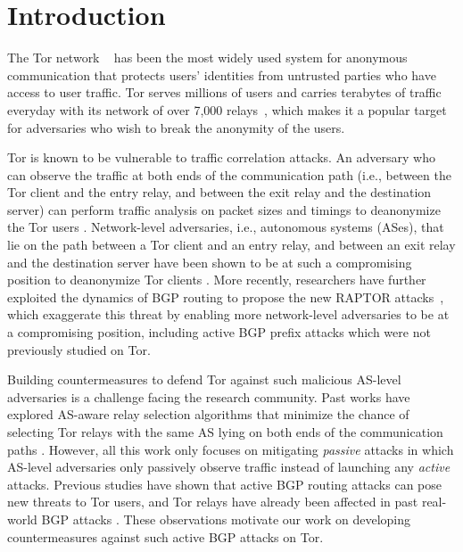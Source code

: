 \section{Introduction}

The Tor network ~\cite{dingledine2004tor} has been the most widely used system for anonymous communication that protects users' identities from untrusted parties who have access to user traffic. Tor serves millions of users and carries terabytes of traffic everyday with its network of over 7,000 relays~\cite{tormetrics}, which makes it a popular target for adversaries who wish to break the anonymity of the users. 

Tor is known to be vulnerable to traffic correlation attacks. An adversary who can observe the traffic at both ends of the communication path (i.e., between the Tor client and the entry relay, and between the exit relay and the destination server) can perform traffic analysis on packet sizes and timings to deanonymize the Tor users \cite{shmatikov2006timing, syverson2001towards}. Network-level adversaries, i.e., autonomous systems (ASes), that lie on the path between a Tor client and an entry relay, and between an exit relay and the destination server have been shown to be at such a compromising position to deanonymize Tor clients \cite{edman2009awareness, feamster2004location, johnson2013users}. More recently, researchers have further exploited the dynamics of BGP routing to propose the new RAPTOR attacks~\cite{sun2015raptor}, which exaggerate this threat by enabling more network-level adversaries to be at a compromising position, including active BGP prefix attacks which were not previously studied on Tor. 

Building countermeasures to defend Tor against such malicious AS-level adversaries is a challenge facing the research community. Past works have explored AS-aware relay selection algorithms that minimize the chance of selecting Tor relays with the same AS lying on both ends of the communication paths \cite{akhoondi2012lastor, edman2009awareness, starov2015measuring}. However, all this work only focuses on mitigating \emph{passive} attacks in which AS-level adversaries only passively observe traffic instead of launching any \emph{active} attacks. Previous studies have shown that active BGP routing attacks can pose new threats to Tor users, and Tor relays have already been affected in past real-world BGP attacks \cite{sun2015raptor}. These observations motivate our work on developing countermeasures against such active BGP attacks on Tor. 

